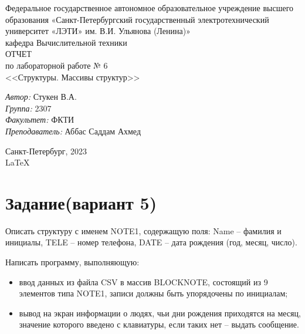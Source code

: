 \documentclass[a4paper,12pt]{report}
\begin{document}
 

\begin{titlepage} 

\begin{center} 

\large Федеральное государственное автономное образовательное учреждение высшего образования «Санкт-Петербургский государственный электротехнический университет «ЛЭТИ» им. В.И. Ульянова (Ленина)»\\
кафедра Вычислительной техники\\[5cm] 

\huge ОТЧЕТ\\ по лабораторной работе № 6\\[0.5cm] 
\large <<Структуры. Массивы структур>>\\[3.7cm]

\begin{minipage}{1\textwidth}
    \begin{flushleft}
        \emph{Автор:} Стукен В.А.\\
        \emph{Группа:} 2307\\
        \emph{Факультет:} ФКТИ\\
        \emph{Преподаватель:} Аббас Саддам Ахмед\\
    \end{flushleft}
\end{minipage}

\vfill

Санкт-Петербург, 2023\\
{\large \LaTeX}

\end{center}
\thispagestyle{empty}
\end{titlepage}

\section*{Задание(вариант 5)}
Описать структуру с именем NOTE1, содержащую поля: Name – фамилия и инициалы, TELE – номер телефона, DATE – дата рождения (год, месяц, число).

Написать программу, выполняющую:
\begin{itemize}
    \item ввод данных из файла CSV в массив BLOCKNOTE, состоящий из 9 элементов типа NOTE1, записи должны быть упорядочены по инициалам;
    \item вывод на экран информации о людях, чьи дни рождения приходятся на месяц, значение которого введено с клавиатуры, если таких нет – выдать сообщение.

\end{itemize}
\end{document}
